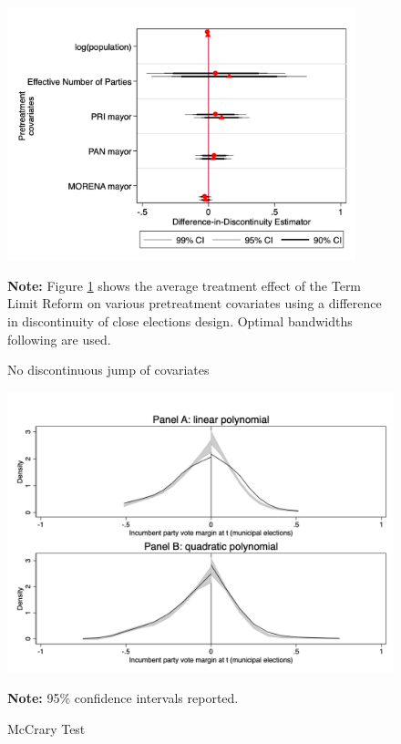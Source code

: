  \begin{figure}[h]   
\centering
 \caption{No discontinuous jump of covariates}
 \label{fig:jump_covariates}
\includegraphics[width=0.9\textwidth]{Chapter2/Figures_incumbency/nojump.png}
       \captionsetup{justification=centering}
    
 \textbf{Note:} Figure \ref{fig:jump_covariates} shows the average treatment effect of the Term Limit Reform on various pretreatment covariates using a difference in discontinuity of close elections design. Optimal bandwidths following \citet{calonicoetal_2014} are used. 
   
\end{figure} 

  
    
    
\begin{figure}[h]   
\centering
 \caption{McCrary Test}
 \label{fig:mccrary}
\includegraphics[width=1\textwidth]{Chapter2/Figures_incumbency/mccrary_pol1_2.png}

       \captionsetup{justification=centering}
         
 \textbf{Note:} 95\% confidence intervals reported.
 
\end{figure} 



